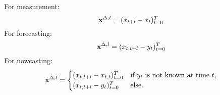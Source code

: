 For measurement:
\begin{equation}
	\mathbf{x}^{\Delta,l} = (x_{t+l} -x_{t})^T_{t=0} \label{eq:diffxl_measure}
\end{equation}
For forecasting: 
\begin{equation}
	\mathbf{x}^{\Delta,l} = (x_{t,t+l} -y_{t})^T_{t=0} \label{eq:diffxl_forecasting}
\end{equation}
For nowcasting:
\begin{equation}
\mathbf{x}^{\Delta,l} = 
\begin{cases} 
(x_{t,t+l} -x_{t,t})^T_{t=0} & \text{if } y_{t} \text{ is not known at time } t, \\
(x_{t,t+l} -y_{t})^T_{t=0}  & \text{else}.
\end{cases} \label{eq:diffxl_nowcasting}
\end{equation}










